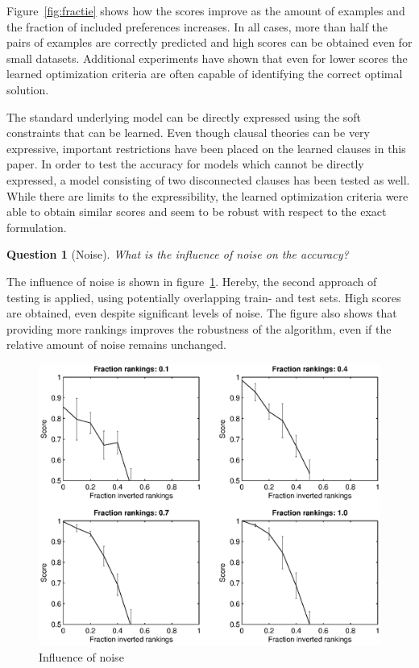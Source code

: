 \documentclass[letterpaper]{article}
\newtheorem{question}{Question}
\theoremstyle{definition}
\begin{document}
Figure~\ref{fig:fractie} shows how the scores improve as the amount of examples and the fraction of included preferences increases.
In all cases, more than half the pairs of examples are correctly predicted and high scores can be obtained even for small datasets.
Additional experiments have shown that even for lower scores the learned optimization criteria are often capable of identifying the correct optimal solution.

The standard underlying model can be directly expressed using the soft constraints that can be learned.
Even though clausal theories can be very expressive, important restrictions have been placed on the learned clauses in this paper.
In order to test the accuracy for models which cannot be directly expressed, a model consisting of two disconnected clauses has been tested as well.
While there are limits to the expressibility, the learned optimization criteria were able to obtain similar scores and seem to be robust with respect to the exact formulation.

\begin{question}[Noise]
  What is the influence of noise on the accuracy?
\end{question}

The influence of noise is shown in figure~\ref{fig:ruis}.
Hereby, the second approach of testing is applied, using potentially overlapping train- and test sets.
High scores are obtained, even despite significant levels of noise.
The figure also shows that providing more rankings improves the robustness of the algorithm, even if the relative amount of noise remains unchanged.

\begin{figure}
  \centering
    \includegraphics[width=1.1\linewidth]{noise}
  \caption{Influence of noise}
  \label{fig:ruis}
\end{figure}
\end{document}
